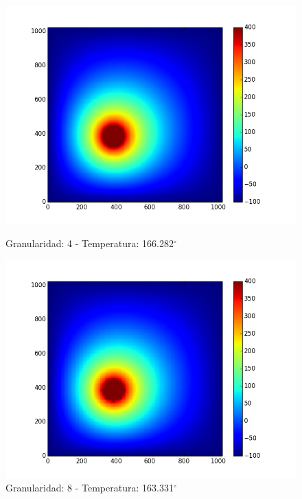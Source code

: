 \begin{figure}[htb]
\begin{center}
\includegraphics[scale=0.3]{imagenes/caso2_4.png} 
\caption{Granularidad: 4 - Temperatura: 166.282$^{\circ}$} 
        \end{center}
\endminipage\hfill
{}
\begin{center}
\includegraphics[scale=0.3]{imagenes/caso2_8.png} 
\caption{Granularidad: 8 - Temperatura: 163.331$^{\circ}$} 
        \end{center}
\endminipage\hfill 
\end{figure}

